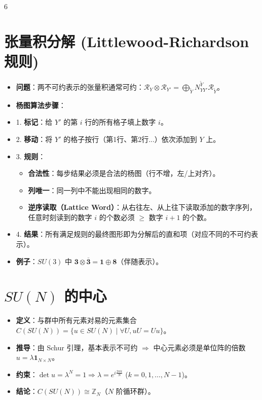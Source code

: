 \documentclass[landscape]{article}
\begin{document}
\begin{multicols*}{6}
\section*{张量积分解 (Littlewood-Richardson 规则)}
\begin{itemize}
  \item \textbf{问题}：两不可约表示的张量积通常可约：$\mathcal{R}_Y \otimes \mathcal{R}_{Y'} = \bigoplus_{\tilde{Y}} N_{Y Y'}^{\tilde{Y}} \mathcal{R}_{\tilde{Y}}$。
  \item \textbf{杨图算法步骤}：
  \item 1. \textbf{标记}：给 $Y'$ 的第 $i$ 行的所有格子填上数字 $i$。
  \item 2. \textbf{移动}：将 $Y'$ 的格子按行（第1行、第2行...）依次添加到 $Y$ 上。
  \item 3. \textbf{规则}：
    \begin{itemize}
      \item \textbf{合法性}：每步结果必须是合法的杨图（行不增，左/上对齐）。
      \item \textbf{列唯一}：同一列中不能出现相同的数字。
      \item \textbf{逆序读取（Lattice Word）}：从右往左、从上往下读取添加的数字序列，任意时刻读到的数字 $i$ 的个数必须 $\ge$ 数字 $i+1$ 的个数。
    \end{itemize}
  \item 4. \textbf{结果}：所有满足规则的最终图形即为分解后的直和项（对应不同的不可约表示）。
  \item \textbf{例子}：$SU(3)$ 中 $\mathbf{3} \otimes \overline{\mathbf{3}} = \mathbf{1} \oplus \mathbf{8}$（伴随表示）。
\end{itemize}

\section*{$SU(N)$ 的中心}
\begin{itemize}
  \item \textbf{定义}：与群中所有元素对易的元素集合 $C(SU(N)) = \{u \in SU(N) \mid \forall U, uU=Uu\}$。
  \item \textbf{推导}：由 Schur 引理，基本表示不可约 $\Rightarrow$ 中心元素必须是单位阵的倍数 $u = \lambda \mathbf{1}_{N \times N}$。
  \item \textbf{约束}：$\det u = \lambda^N = 1 \Rightarrow \lambda = e^{i \frac{2\pi k}{N}}$ ($k=0, 1, \dots, N-1$)。
  \item \textbf{结论}：$C(SU(N)) \cong \mathbb{Z}_N$（$N$ 阶循环群）。
\end{itemize}
\end{multicols*}
\end{document}
